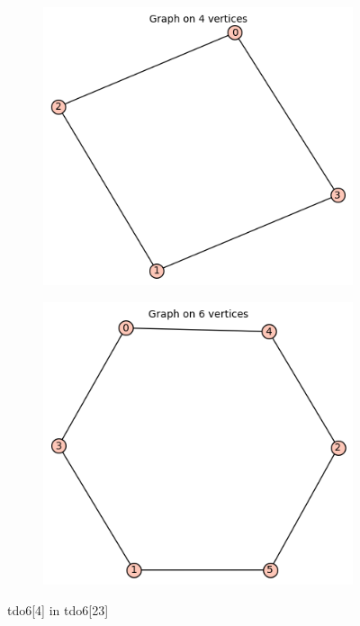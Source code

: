 \documentclass[12pt, a4paper]{article}
\begin{document}
\begin{center}
\begin{figure}[!htb]
\centering
\begin{subfigure}{0.5\textwidth}
  \centering
  \includegraphics[width=0.5\linewidth]{tdo6[4]}
\end{subfigure}%
\begin{subfigure}{0.5\textwidth}
  \centering
  \includegraphics[width=0.5\linewidth]{tdo6[23]}
\end{subfigure}
\caption{tdo6[4] in tdo6[23]}
\label{fig:test}
\end{figure}


\end{center}
\end{document}
